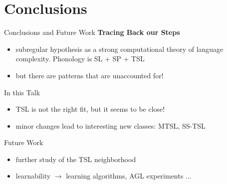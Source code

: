 \documentclass[xcolor={usenames,svgnames,x11names,table}]{beamer}
\begin{document}
\section[Conclusions]{Conclusions} 

\begin{frame}{Conclusions and Future Work}
        \textbf{\textcolor{SkyBlue3!90!black}{Tracing Back our Steps}}
        \begin{itemize}
        \item  subregular hypothesis as a strong computational theory of language complexity.  Phonology is SL + SP + TSL
        \item  but there are patterns that are unaccounted for!
        \end{itemize}
        
        \pause
        \begin{block}{In this Talk}
        \begin{itemize}
        \item TSL is not the right fit, but it seems to be close!
        \item minor changes lead to interesting new classes: MTSL, SS-TSL 
        \end{itemize}
        \end{block}
        \pause
        \begin{alertblock}{Future Work}
        \begin{itemize}
        \item further study of the TSL neighborhood 
        \item learnability $\rightarrow$ learning algorithms, AGL experiments ...
        \end{itemize}
        
        \end{alertblock}
 
 \end{frame}  
\end{document}
